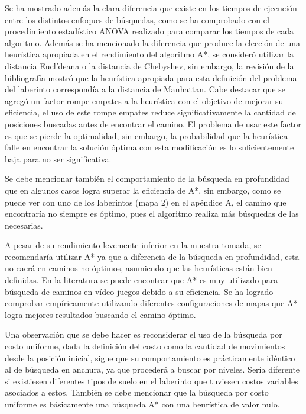 \documentclass[letter, titlepage, 10pt]{article}
\begin{document}
Se ha mostrado además la clara diferencia que existe en los tiempos de ejecución entre los distintos enfoques de búsquedas, como se ha comprobado con el procedimiento estadístico ANOVA realizado para comparar los tiempos de cada algoritmo. Además se ha mencionado la diferencia que produce la elección de una heurística apropiada en el rendimiento del algoritmo A*, se consideró utilizar la distancia Euclídeana o la distancia de Chebyshev, sin embargo, la revisión de la bibliografía mostró que la heurística apropiada para esta definición del problema del laberinto correspondía a la distancia de Manhattan. Cabe destacar que se agregó un factor rompe empates a la heurística con el objetivo de mejorar su eficiencia, el uso de este rompe empates reduce significativamente la cantidad de posiciones buscadas antes de encontrar el camino. El problema de usar este factor es que se pierde la optimalidad, sin embargo, la probabilidad que la heurística falle en encontrar la solución óptima con esta modificación es lo suficientemente baja para no ser significativa. 

Se debe mencionar también el comportamiento de la búsqueda en profundidad que en algunos casos logra superar la eficiencia de A*, sin embargo, como se puede ver con uno de los laberintos (mapa 2) en el apéndice A, el camino que encontraría no siempre es óptimo, pues el algoritmo realiza más búsquedas de las necesarias.

A pesar de su rendimiento levemente inferior en la muestra tomada, se recomendaría utilizar A* ya que a diferencia de la búsqueda en profundidad, esta no caerá en caminos no óptimos, asumiendo que las heurísticas están bien definidas. En la literatura se puede encontrar que A* es muy utilizado para búsqueda de caminos en vídeo juegos debido a su eficiencia. Se ha logrado comprobar empíricamente utilizando diferentes configuraciones de mapas que A* logra mejores resultados buscando el camino óptimo.

Una observación que se debe hacer es reconsiderar el uso de la búsqueda por costo uniforme, dada la definición del costo como la cantidad de movimientos desde la posición inicial, sigue que su comportamiento es prácticamente idéntico al de búsqueda en anchura, ya que procederá a buscar por niveles. Sería diferente si existiesen diferentes tipos de suelo en el laberinto que tuviesen costos variables asociados a estos. También se debe mencionar que la búsqueda por costo uniforme es básicamente una búsqueda A* con una heurística de valor nulo.
\end{document}
